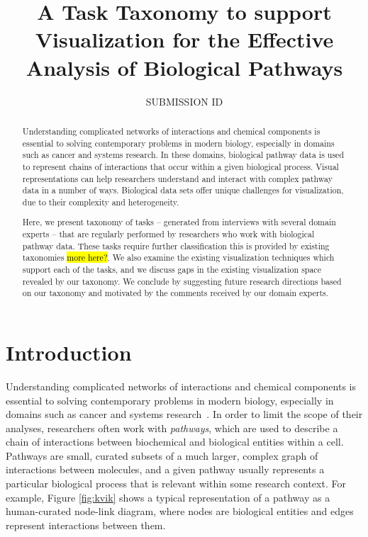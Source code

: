 \documentclass{egpubl}
\title[A Task Taxonomy to support Visualization for the Effective Analysis of Biological Pathways]%
      {A Task Taxonomy to support Visualization for the Effective Analysis of Biological Pathways}
\author[]{SUBMISSION ID}
\begin{document}

\maketitle

\begin{abstract}
Understanding complicated networks of interactions and chemical components is essential to solving contemporary problems in modern biology, especially in domains such as cancer and systems research.
In these domains, biological pathway data is used to represent chains of interactions that occur within a given biological process.
Visual representations can help researchers understand and interact with complex pathway data in a number of ways.
Biological data sets offer unique challenges for visualization, due to their complexity and heterogeneity.

Here, we present taxonomy of tasks -- generated from interviews with several domain experts -- that are regularly performed by researchers who work with biological pathway data.
These tasks require further classification this is provided by existing taxonomies \hl{more here?}.
We also examine the existing visualization techniques which support each of the tasks, and we discuss gaps in the existing visualization space revealed by our taxonomy.
We conclude by suggesting future research directions based on our taxonomy and motivated by the comments received by our domain experts.


\begin{classification} %
\end{classification}

\end{abstract}

\section{Introduction}

Understanding complicated networks of interactions and chemical components is essential to solving contemporary problems in modern biology, especially in domains such as cancer and systems research~\cite{hanahan2011hallmarks}.
In order to limit the scope of their analyses, researchers often work with \emph{pathways}, which are used to describe a chain of interactions between biochemical and biological entities within a cell.
Pathways are small, curated subsets of a much larger, complex graph of interactions between molecules, and a given pathway usually represents a particular biological process that is relevant within some research context.
 For example, Figure \ref{fig:kvik} shows a typical representation of a pathway as a human-curated node-link diagram, where nodes are biological entities and edges represent interactions between them.
\end{document}
